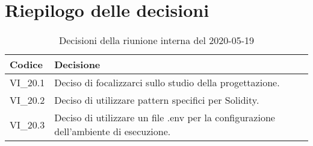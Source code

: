 \section{Riepilogo delle decisioni}
\begin{longtable}{ 
	 >{\centering}p{} >{}p{} }
	
	\caption{Decisioni della riunione interna del 2020-05-19}\\	
	
	\textbf{\color{white}Codice} & 
	\textbf{\color{white}Decisione} 
	\tabularnewline  
	\endhead
	
	VI\_20.1 & Deciso di focalizzarci sullo studio della progettazione. \\
	VI\_20.2 & Deciso di utilizzare pattern specifici per Solidity\ped{\textit{G}}. \\
	VI\_20.3 & Deciso di utilizzare un file .env per la configurazione dell'ambiente di esecuzione. \\
\end{longtable}